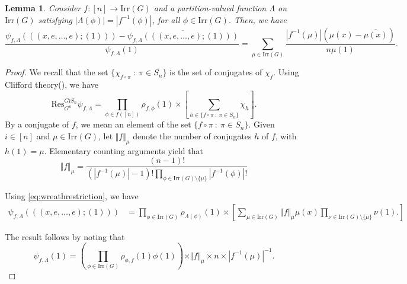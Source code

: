 \documentclass{amsart}
\theoremstyle{plain}
\newtheorem{lemma}[theorem]{Lemma}
\theoremstyle{remark}\newtheorem{con}[theorem]{Construction}
\theoremstyle{remark} \newtheorem*{remark}{Remark}
\theoremstyle{remark} \newtheorem{example}{Example}
\newcommand{\mrm}{\mathrm}
\newcommand{\ov}{\overline}
\newcommand{\irr}{\mathrm{Irr}}
\begin{document}
\begin{lemma}\label{lem:centralcharacterc1}
Consider $f:[n]\to \irr(G)$ and a partition-valued function $\Lambda$ on $\irr(G)$ satisfying $|\Lambda(\phi)|=|f^{-1}(\phi)|$, for all $\phi \in \irr(G)$. Then, we have
\begin{equation*}
\dfrac{\psi_{f,\Lambda}(((x,e,\ldots, e); (1)))-\ov{\psi_{f,\Lambda}(((x,e,\ldots, e); (1)))}}{\psi_{f,\Lambda}(1)} = \sum\limits_{\mu \in \irr(G)}  \dfrac{|f^{-1}(\mu)| (\mu(x)-\ov{\mu(x)})}{n\mu(1)}.
\end{equation*}
\end{lemma}
\begin{proof}
We recall that the set $\{\chi_{f\circ \pi}\ :\ \pi \in S_{n}\}$ is the set of conjugates of $\chi_{f}$.
 Using Clifford theory(\cite[Theorems 6.2 and 6.11]{isaacs1994character}), we have
 \begin{equation}\label{eq:wreathrestriction}
\mrm{Res}^{G \wr S_{n}}_{G^{n}} \psi_{f,\Lambda} = \prod\limits_{\phi \in f\left([n]\right)} \rho_{f, \phi}(1) \times \left[\sum\limits_{h\in\{f\circ \pi\ :\ \pi \in S_{n}\}} \chi_{h}\right].
 \end{equation}
By a conjugate of $f$, we mean an element of the set $\{f\circ \pi\ :\ \pi \in S_{n}\}$. Given $i\in [n]$ and $\mu \in \irr(G)$, let $\Vert f \Vert_{\mu}$ denote the number of conjugates $h$ of $f$, with $h(1)=\mu$. Elementary counting arguments yield that 
\[\Vert f \Vert_{\mu} =  \dfrac{(n-1)!}{\left(|f^{-1}(\mu)|-1\right)! \prod\limits_{\phi \in \irr(G) \setminus \{\mu\}} |f^{-1}(\phi)|! } \]

Using \eqref{eq:wreathrestriction}, we have 
\begin{align*}
\psi_{f,\Lambda}(((x,e,\ldots, e); (1))) & = \prod\limits_{\phi \in \irr(G)} \rho_{\Lambda(\phi)}(1) \times \left[\sum\limits_{\mu \in \irr(G)} \Vert f\Vert_{\mu} \mu (x)  \prod\limits_{\nu \in \irr(G) \setminus \{\mu\}} \nu(1). \right ]
\end{align*}

The result follows by noting that \[\psi_{f,\Lambda}(1) = \left(\prod\limits_{\phi \in \irr(G)} \rho_{\phi, f}(1)\phi(1)\right) \times \Vert f \Vert_ {\mu} \times n\times |f^{-1}(\mu)|^{-1}.\]
\end{proof}
\end{document}
